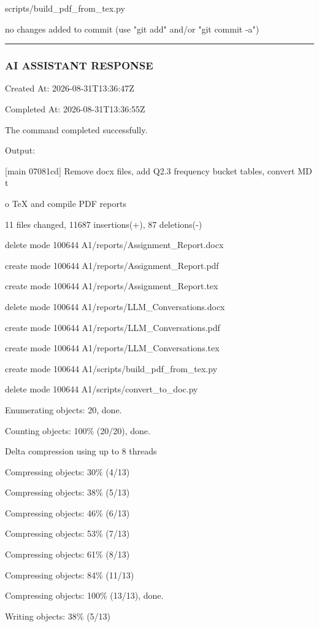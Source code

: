 \documentclass[11pt,a4paper]{article}
\begin{document}
{scripts/build\_pdf\_from\_tex.py


no changes added to commit (use "git add" and/or "git commit -a")


\hrule

\subsubsection{AI ASSISTANT RESPONSE}

Created At: 2026-08-31T13:36:47Z

Completed At: 2026-08-31T13:36:55Z


The command completed successfully.

Output:

[main 07081cd] Remove docx files, add Q2.3 frequency bucket tables, convert MD t

o TeX and compile PDF reports

11 files changed, 11687 insertions(+), 87 deletions(-)

delete mode 100644 A1/reports/Assignment\_Report.docx

create mode 100644 A1/reports/Assignment\_Report.pdf

create mode 100644 A1/reports/Assignment\_Report.tex

delete mode 100644 A1/reports/LLM\_Conversations.docx

create mode 100644 A1/reports/LLM\_Conversations.pdf

create mode 100644 A1/reports/LLM\_Conversations.tex

create mode 100644 A1/scripts/build\_pdf\_from\_tex.py

delete mode 100644 A1/scripts/convert\_to\_doc.py

Enumerating objects: 20, done.

Counting objects: 100\% (20/20), done.

Delta compression using up to 8 threads

Compressing objects:  30\% (4/13)

Compressing objects:  38\% (5/13)

Compressing objects:  46\% (6/13)

Compressing objects:  53\% (7/13)

Compressing objects:  61\% (8/13)

Compressing objects:  84\% (11/13)

Compressing objects: 100\% (13/13), done.

Writing objects:  38\% (5/13)

}
\end{document}
